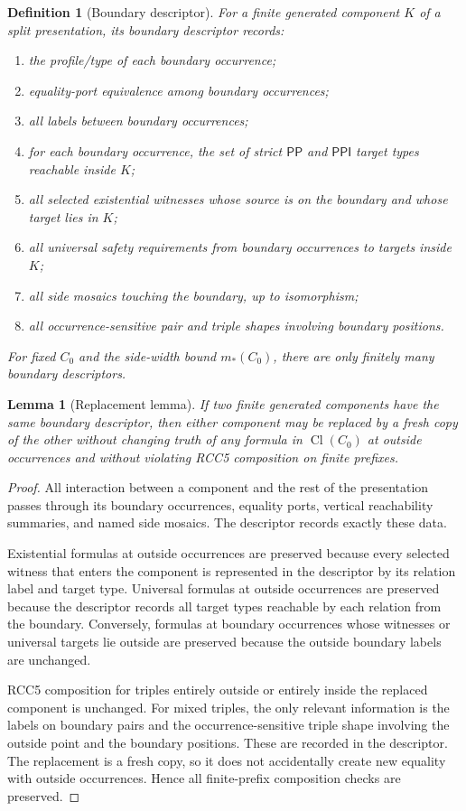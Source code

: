\documentclass[11pt]{article}
\newtheorem{lemma}[theorem]{Lemma}
\newtheorem{definition}[theorem]{Definition}
\newcommand{\PP}{\mathsf{PP}}
\newcommand{\PPI}{\mathsf{PPI}}
\newcommand{\Cl}{\operatorname{Cl}}
\begin{document}
\begin{definition}[Boundary descriptor]\label{def:boundary-descriptor}
For a finite generated component $K$ of a split presentation, its boundary descriptor records:
\begin{enumerate}[label=(D\arabic*)]
\item the profile/type of each boundary occurrence;
\item equality-port equivalence among boundary occurrences;
\item all labels between boundary occurrences;
\item for each boundary occurrence, the set of strict $\PP$ and $\PPI$ target types reachable inside $K$;
\item all selected existential witnesses whose source is on the boundary and whose target lies in $K$;
\item all universal safety requirements from boundary occurrences to targets inside $K$;
\item all side mosaics touching the boundary, up to isomorphism;
\item all occurrence-sensitive pair and triple shapes involving boundary positions.
\end{enumerate}
For fixed $C_0$ and the side-width bound $m_*(C_0)$, there are only finitely many boundary descriptors.
\end{definition}

\begin{lemma}[Replacement lemma]\label{lem:replacement}
If two finite generated components have the same boundary descriptor, then either component may be replaced by a fresh copy of the other without changing truth of any formula in $\Cl(C_0)$ at outside occurrences and without violating RCC5 composition on finite prefixes.
\end{lemma}

\begin{proof}
All interaction between a component and the rest of the presentation passes through its boundary occurrences, equality ports, vertical reachability summaries, and named side mosaics.  The descriptor records exactly these data.

Existential formulas at outside occurrences are preserved because every selected witness that enters the component is represented in the descriptor by its relation label and target type.  Universal formulas at outside occurrences are preserved because the descriptor records all target types reachable by each relation from the boundary.  Conversely, formulas at boundary occurrences whose witnesses or universal targets lie outside are preserved because the outside boundary labels are unchanged.

RCC5 composition for triples entirely outside or entirely inside the replaced component is unchanged.  For mixed triples, the only relevant information is the labels on boundary pairs and the occurrence-sensitive triple shape involving the outside point and the boundary positions.  These are recorded in the descriptor.  The replacement is a fresh copy, so it does not accidentally create new equality with outside occurrences.  Hence all finite-prefix composition checks are preserved.
\end{proof}
\end{document}
